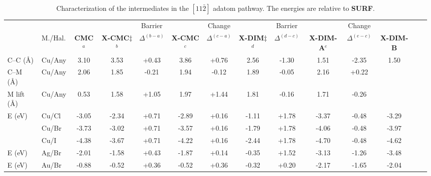 \documentclass[journal=jpclcd,layout=traditional,manuscript=letter]{achemso} %
\begin{document}
\begin{table}
\centering
\scriptsize
\caption{Characterization of the intermediates in the $[11\bar{2}]$ adatom pathway. The energies are relative to \textbf{SURF}. 
}
\label{table:adatom-longitude}
\begin{tabular}{ llcccccccccccc  }
 \hline
 \hline
  & & & & Barrier & & Change & & Barrier & &Change&\\
  & M./Hal. & \textbf{CMC}$^{a}$ & \textbf{X-CMC$\ddagger$}$^{b}$ & $\Delta^{(b-a)}$ & \textbf{X-CMC}$^{c}$ &$\Delta^{(c-a)}$ & \textbf{X-DIM$\ddagger$}$^{d}$ & $\Delta^{(d-c)}$ & \textbf{X-DIM-A}$^{e}$ &$\Delta^{(e-c)}$ & \textbf{X-DIM-B}  \\ 
 \hline
 \hline 
 {C--C (\si{\angstrom})} & Cu/Any & {3.10} & {3.53} & {+0.43} & {3.86} &{+0.76} & {2.56} & {-1.30} & {1.51} &{-2.35} &{1.50}\\ 
 \hline
 {C--M (\si{\angstrom}) } & Cu/Any & {2.06} & {1.85} & {-0.21} & {1.94} &{-0.12} & {1.89} & {-0.05} & {2.16} &{+0.22} & \\ 
 \hline
 {M lift (\si{\angstrom}) } & Cu/Any & {0.53} & {1.58} & {+1.05} & {1.97} &{+1.44} & {1.81} & {-0.16} & {1.71} &{-0.26} & \\ 
 \hline
 \multirow{3}{*}{E (\si{\electronvolt}) } & Cu/Cl & -3.05 &-2.34 & +0.71 &-2.89 &+0.16 &-1.11 & +1.78 & -3.37&-0.48&-3.29\\ 
 & Cu/Br &-3.73 &-3.02 &+0.71 & -3.57 &+0.16 &-1.79 & +1.78 & -4.06 & -0.48&-3.97 \\ 
 & Cu/I  & -4.38 & -3.67 & +0.71 & -4.22 &+0.16 &-2.44 & +1.78 & -4.70 & -0.48&-4.62\\ 
 \hline
 E (\si{\electronvolt}) & Ag/Br &-2.01 &-1.58 &+0.43 &-1.87 &+0.14 &-0.35 &+1.52 &-3.13 &-1.26 &-3.48 \\ 
 E (\si{\electronvolt}) & Au/Br &-0.88 &-0.52 &+0.36 &-0.52 &+0.36 &-0.32 &+0.20 &-2.17 &-1.65 &-2.04 \\
  \hline
 \hline
\end{tabular}
\end{table}
\end{document}
